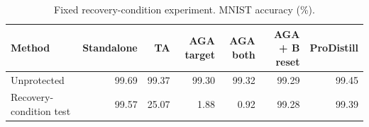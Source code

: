 \begin{table}[t]
\centering\small
\caption{Fixed recovery-condition experiment. MNIST accuracy (\%).}
\begin{tabular}{lrrrrrr}
\toprule
Method & Standalone & TA & AGA target & AGA both & AGA + B reset & ProDistill \\
\midrule
Unprotected & 99.69 & 99.37 & 99.30 & 99.32 & 99.29 & 99.45 \\
Recovery-condition test & 99.57 & 25.07 & 1.88 & 0.92 & 99.28 & 99.39 \\
\bottomrule
\end{tabular}
\end{table}
